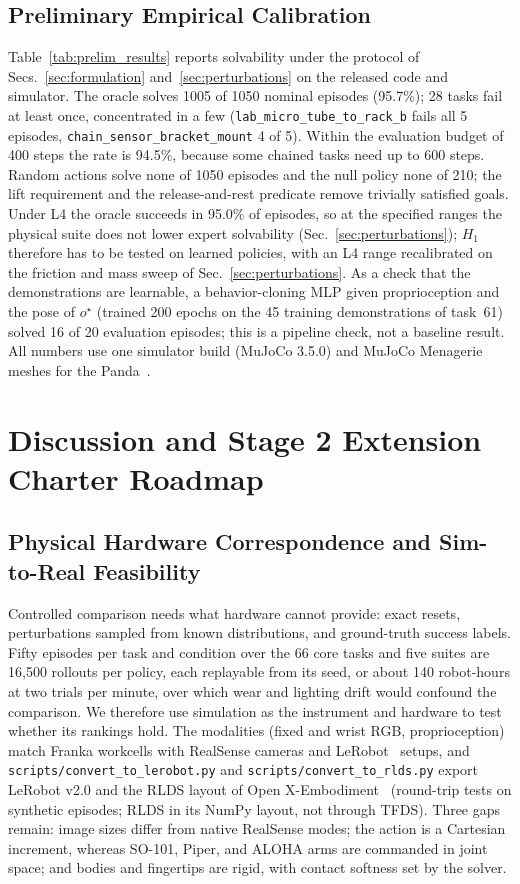 \documentclass[conference]{IEEEtran}
\begin{document}
\subsection{Preliminary Empirical Calibration}
Table~\ref{tab:prelim_results} reports solvability under the protocol of Secs.~\ref{sec:formulation} and~\ref{sec:perturbations} on the released code and simulator. The oracle solves 1005 of 1050 nominal episodes (95.7\%); 28 tasks fail at least once, concentrated in a few (\texttt{lab\_micro\_tube\_to\_rack\_b} fails all 5 episodes, \texttt{chain\_sensor\_bracket\_mount} 4 of 5). Within the evaluation budget of 400 steps the rate is 94.5\%, because some chained tasks need up to 600 steps. Random actions solve none of 1050 episodes and the null policy none of 210; the lift requirement and the release-and-rest predicate remove trivially satisfied goals. Under L4 the oracle succeeds in 95.0\% of episodes, so at the specified ranges the physical suite does not lower expert solvability (Sec.~\ref{sec:perturbations}); $H_1$ therefore has to be tested on learned policies, with an L4 range recalibrated on the friction and mass sweep of Sec.~\ref{sec:perturbations}. As a check that the demonstrations are learnable, a behavior-cloning MLP given proprioception and the pose of $o^\star$ (trained 200 epochs on the 45 training demonstrations of task~61) solved 16 of 20 evaluation episodes; this is a pipeline check, not a baseline result. All numbers use one simulator build (MuJoCo 3.5.0) and MuJoCo Menagerie meshes for the Panda~\cite{menagerie2022github}.

\section{Discussion and Stage 2 Extension Charter Roadmap}
\label{sec:conclusion}

\subsection{Physical Hardware Correspondence and Sim-to-Real Feasibility}
Controlled comparison needs what hardware cannot provide: exact resets, perturbations sampled from known distributions, and ground-truth success labels. Fifty episodes per task and condition over the 66 core tasks and five suites are 16{,}500 rollouts per policy, each replayable from its seed, or about 140 robot-hours at two trials per minute, over which wear and lighting drift would confound the comparison. We therefore use simulation as the instrument and hardware to test whether its rankings hold. The modalities (fixed and wrist RGB, proprioception) match Franka workcells with RealSense cameras and LeRobot~\cite{cadene2024lerobot} setups, and \texttt{scripts/convert\_to\_lerobot.py} and \texttt{scripts/convert\_to\_rlds.py} export LeRobot v2.0 and the RLDS layout of Open X-Embodiment~\cite{padalkar2023openx} (round-trip tests on synthetic episodes; RLDS in its NumPy layout, not through TFDS). Three gaps remain: image sizes differ from native RealSense modes; the action is a Cartesian increment, whereas SO-101, Piper, and ALOHA arms are commanded in joint space; and bodies and fingertips are rigid, with contact softness set by the solver.
\end{document}
